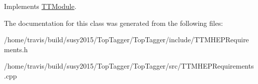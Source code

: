 Implements \hyperlink{classTTModule_a14e7c03fbf4ee1a5008c9344adc7c896}{T\-T\-Module}.



The documentation for this class was generated from the following files\-:\begin{DoxyCompactItemize}
\item 
/home/travis/build/susy2015/\-Top\-Tagger/\-Top\-Tagger/include/T\-T\-M\-H\-E\-P\-Requirements.\-h\item 
/home/travis/build/susy2015/\-Top\-Tagger/\-Top\-Tagger/src/T\-T\-M\-H\-E\-P\-Requirements.\-cpp\end{DoxyCompactItemize}
